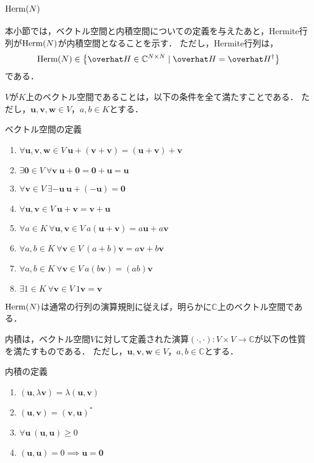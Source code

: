 \documentclass{report}
\begin{document}
  \subsection{$\mathrm{Herm}(N)$}
    本小節では，ベクトル空間と内積空間についての定義を与えたあと，Hermite行列が$\mathrm{Herm}(N)$が内積空間となることを示す．
    ただし，Hermite行列は，
    \begin{align}
      \r{Herm}(N) \in \qty{\hat{H} \in \mathbb{C}^{N\times N} \mid \hat{H} = \hat{H}^{\dag}}
    \end{align}
    である．
    \par
    $V$が$K$上のベクトル空間であることは，以下の条件を全て満たすことである．
    ただし，$\bm{u}, \bm{v}, \bm{w} \in V$，$a, b \in K$とする．
    \begin{itembox}[l]{ベクトル空間の定義}
      \begin{enumerate}
        \item $\forall \bm{u}, \bm{v}, \bm{w} \in V\ \bm{u} + (\bm{v} + \bm{v}) = (\bm{u} + \bm{v}) + \bm{v}$
        \item $\exists \bm{0} \in V\ \forall \bm{v}\ \bm{u} + \bm{0} = \bm{0} + \bm{u} = \bm{u} $
        \item $\forall \bm{v} \in V\ \exists -\bm{u}\ \bm{u} + (-\bm{u}) = \bm{0}$
        \item $\forall \bm{u}, \bm{v} \in V\ \bm{u} + \bm{v} = \bm{v} + \bm{u}$
        \item $\forall a \in K\ \forall \bm{u}, \bm{v} \in V\ a(\bm{u} + \bm{v}) = a\bm{u} + a\bm{v}$
        \item $\forall a, b \in K\ \forall \bm{v} \in V\ (a + b)\bm{v} = a\bm{v} + b\bm{v}$
        \item $\forall a, b \in K\ \forall \bm{v} \in V\ a(b\bm{v}) = (ab)\bm{v}$
        \item $\exists 1 \in K\ \forall \bm{v} \in V\ 1\bm{v} = \bm{v}$
      \end{enumerate}
    \end{itembox}
    $\mathrm{Herm}(N)$は通常の行列の演算規則に従えば，明らかに$\mathbb{C}$上のベクトル空間である．
    \par
    内積は，ベクトル空間$V$に対して定義された演算$(\cdot, \cdot): V\times V \to \mathbb{C}$が以下の性質を満たすものである．
    ただし，$\bm{u}, \bm{v}, \bm{w} \in V$，$a, b \in \mathbb{C}$とする．
    \begin{itembox}[l]{内積の定義}
      \begin{enumerate}
        \item $(\bm{u}, \lambda \bm{v}) = \lambda (\bm{u}, \bm{v})$
        \item $(\bm{u}, \bm{v}) = (\bm{v}, \bm{u})^*$
        \item $\forall \bm{u}\ (\bm{u}, \bm{u}) \geq 0$
        \item $(\bm{u}, \bm{u}) = 0 \implies \bm{u} = \bm{0}$
      \end{enumerate}
    \end{itembox}
\end{document}
